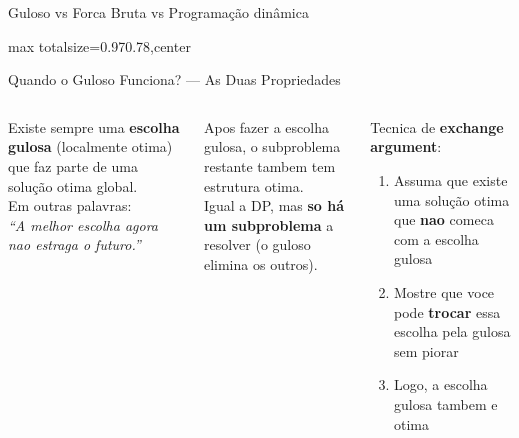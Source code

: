 \documentclass[aspectratio=169,10pt]{beamer}
\begin{document}
\begin{frame}{Guloso vs Forca Bruta vs Programação dinâmica}
\begin{adjustbox}{max totalsize={0.97\textwidth}{0.78\textheight},center}
  \end{adjustbox}
\end{frame}

\begin{frame}{Quando o Guloso Funciona? --- As Duas Propriedades}
  \begin{columns}[t]
      \begin{tcolorbox}[caixaDourada,title={1. Greedy Choice Property}]
        \small
        Existe sempre uma \textbf{escolha gulosa}
        (localmente otima) que faz parte de uma
        solução otima global.\\[4pt]
        Em outras palavras:\\
        \textit{``A melhor escolha agora nao estraga o futuro.''}
      \end{tcolorbox}
      \vspace{0.12cm}
      \begin{tcolorbox}[caixaAzul,title={2. Optimal Substructure}]
        \small
        Apos fazer a escolha gulosa, o subproblema
        restante tambem tem estrutura otima.\\[4pt]
        Igual a DP, mas \textbf{so há um subproblema}
        a resolver (o guloso elimina os outros).
      \end{tcolorbox}
      \begin{tcolorbox}[caixaVerde,title={Como provar intuitivamente?}]
        \footnotesize
        Tecnica de \textbf{exchange argument}:\\[3pt]
        \begin{enumerate}\footnotesize
          \item Assuma que existe uma solução otima
                que \textbf{nao} comeca com a escolha gulosa
          \item Mostre que voce pode \textbf{trocar}
                essa escolha pela gulosa sem piorar
          \item Logo, a escolha gulosa tambem e otima
        \end{enumerate}

\end{tcolorbox}
\end{columns}
\end{frame}
\end{document}
